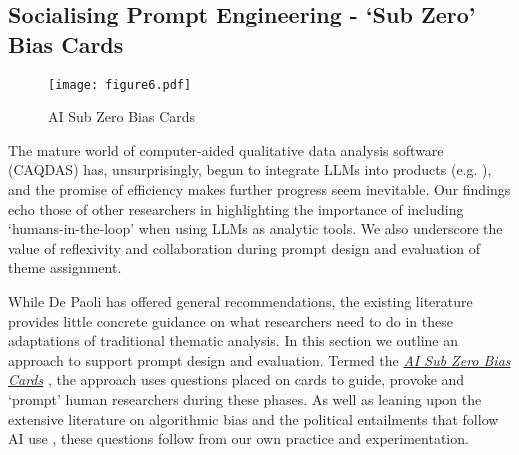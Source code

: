 \documentclass{article}
\begin{document}
\subsection{\texorpdfstring{Socialising Prompt Engineering - `Sub Zero' Bias Cards }{Towards a Collaborative, Social Prompt Engineering - AI Sub Zero Bias Cards }}\label{towards-a-collaborative-social-prompt-engineering-ai-sub-zero-bias-cards}

\begin{figure*}[ht]
\vskip 0.2in
\begin{center}
\centerline{\texttt{[image: figure6.pdf]}}
\caption{AI Sub Zero Bias Cards}
\label{fig6}
\end{center}
\vskip -0.2in
\end{figure*}


The mature world of computer-aided qualitative data analysis software (CAQDAS) has, unsurprisingly, begun to integrate LLMs into products (e.g. \cite{atlas.tiATLASTiAI2024}), and the promise of efficiency makes further progress seem inevitable. Our findings echo those of other researchers \cite{depaoliPerformingInductiveThematic2023, xiaoSupportingQualitativeAnalysis2023, gaoCollabCoderLowerbarrierRigorous2024, jiangSupportingSerendipityOpportunities2021} in highlighting the importance of including `humans-in-the-loop' when using LLMs as analytic tools. We also underscore the value of reflexivity and collaboration during prompt design and evaluation of theme assignment. 

While De Paoli \cite{depaoliPerformingInductiveThematic2023} has offered general recommendations, the existing literature provides little concrete guidance on what researchers need to do in these adaptations of traditional thematic analysis. In this section we outline an approach to support prompt design and evaluation. Termed the \href{https://espace.library.uq.edu.au/view/UQ:f998cc0}{\emph{AI Sub Zero Bias Cards}} \cite{khanAISubZero2023}, the approach uses questions placed on cards to guide, provoke and `prompt' human researchers during these phases. As well as leaning upon the extensive literature on algorithmic bias and the political entailments that follow AI use \cite{angwinMachineBias2016, saitoVerbosityBiasPreference2023, algorithmicjusticeleagueMissionTeamStory2021, mageeIntersectionalBiasCausal2021, offert2022sign, Amoore_2023}, these questions follow from our own practice and experimentation. 
\end{document}
